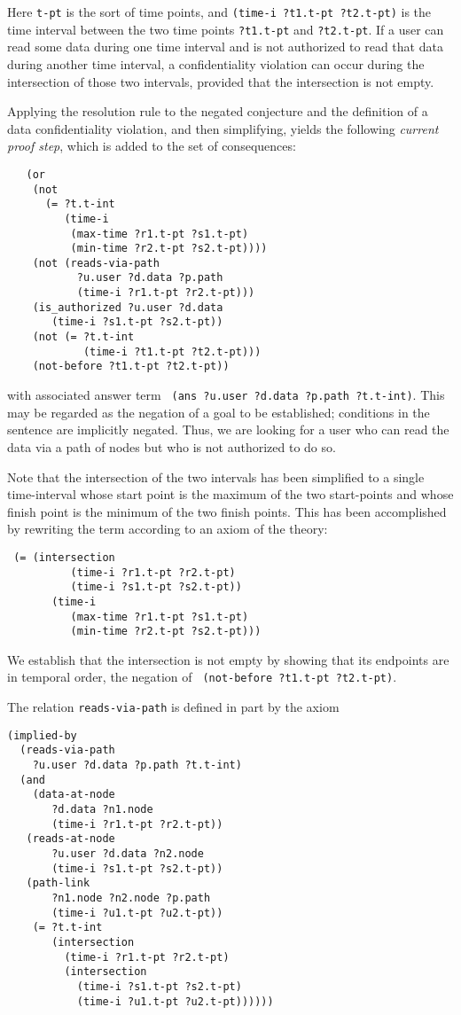 Here  \verb't-pt' is the sort of time points, and \verb'(time-i ?t1.t-pt ?t2.t-pt)' is the time interval between the two time points \verb'?t1.t-pt' and \verb'?t2.t-pt'. If a user can read some data during one time interval and is not authorized to read that data during another time interval, a confidentiality violation can occur during the intersection of those two intervals, provided that the intersection is not empty.

Applying the resolution rule to the negated conjecture and the definition of a data confidentiality violation, and then simplifying, yields the following \textit{current proof step}, which is added to the set of consequences:

\begin{verbatim}
   (or 
    (not 
      (= ?t.t-int
         (time-i 
          (max-time ?r1.t-pt ?s1.t-pt)
          (min-time ?r2.t-pt ?s2.t-pt))))
    (not (reads-via-path
           ?u.user ?d.data ?p.path
           (time-i ?r1.t-pt ?r2.t-pt)))
    (is_authorized ?u.user ?d.data
       (time-i ?s1.t-pt ?s2.t-pt))
    (not (= ?t.t-int
            (time-i ?t1.t-pt ?t2.t-pt)))
    (not-before ?t1.t-pt ?t2.t-pt))
\end{verbatim}
with associated answer term \verb' (ans ?u.user ?d.data ?p.path ?t.t-int)'.
This may be regarded as the negation of a goal to be established; conditions in the sentence are implicitly negated.
Thus, we are looking for a user who can read the data via a path of nodes but who is not authorized to do so.

Note that the intersection of the two intervals has been simplified to a single time-interval whose start point is the maximum of the two start-points and whose finish point is the minimum of the two finish points.  
This has been accomplished by rewriting the term according to an axiom of the theory:

\begin{verbatim}
 (= (intersection
          (time-i ?r1.t-pt ?r2.t-pt)
          (time-i ?s1.t-pt ?s2.t-pt))
       (time-i
          (max-time ?r1.t-pt ?s1.t-pt)
          (min-time ?r2.t-pt ?s2.t-pt)))
\end{verbatim}
We establish that the intersection is not empty by showing that its endpoints are in temporal order, \ie the negation of \verb' (not-before ?t1.t-pt ?t2.t-pt)'.

The relation \verb'reads-via-path' is defined in part by the axiom

\begin{verbatim}
(implied-by
  (reads-via-path
    ?u.user ?d.data ?p.path ?t.t-int)
  (and
    (data-at-node 
       ?d.data ?n1.node 
       (time-i ?r1.t-pt ?r2.t-pt))
   (reads-at-node 
       ?u.user ?d.data ?n2.node 
       (time-i ?s1.t-pt ?s2.t-pt))
   (path-link 
       ?n1.node ?n2.node ?p.path 
       (time-i ?u1.t-pt ?u2.t-pt))   
    (= ?t.t-int
       (intersection
	     (time-i ?r1.t-pt ?r2.t-pt)
	     (intersection
           (time-i ?s1.t-pt ?s2.t-pt)
           (time-i ?u1.t-pt ?u2.t-pt))))))
\end{verbatim}

